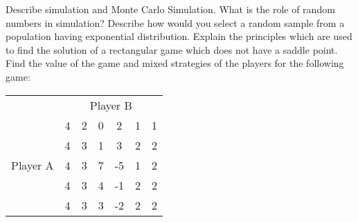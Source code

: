 \myline
{} Describe simulation and Monte Carlo Simulation. What is the role of random numbers in simulation? Describe how would you select a random sample from a population having exponential distribution.
\myline
{} Explain the principles which are used to find the solution of a rectangular game which does not have a saddle point.\\ Find the value of the game and mixed strategies of the players for the following game:
\begin{center}
    \begin{tabular}{c|*{5}{c}c|}
         \multicolumn{1}{c}{}& \multicolumn{6}{c}{Player B} \\ \cline{2-7}
         \multirow{5}{*}{Player A}& 4 & 2 & 0 & 2 & 1 & 1\\
         &4 & 3 & 1 & 3 & 2 & 2\\
         &4 & 3 & 7 & -5 & 1 & 2\\
         &4 & 3 & 4 & -1 & 2 & 2\\
         &4 & 3 & 3 & -2 & 2 & 2\\ \cline{2-7}
    \end{tabular}
\end{center}
